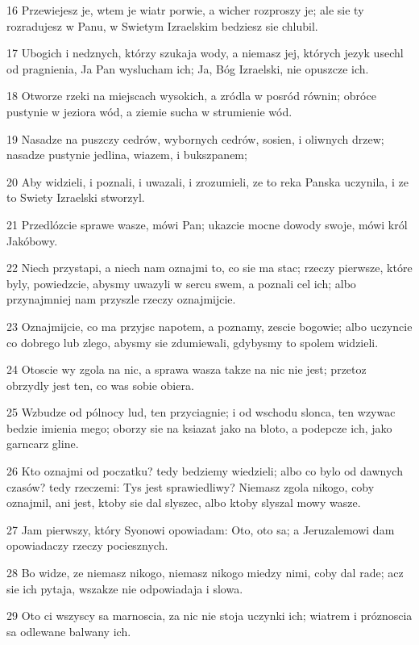 \par 16 Przewiejesz je, wtem je wiatr porwie, a wicher rozproszy je; ale sie ty rozradujesz w Panu, w Swietym Izraelskim bedziesz sie chlubil.
\par 17 Ubogich i nedznych, którzy szukaja wody, a niemasz jej, których jezyk usechl od pragnienia, Ja Pan wyslucham ich; Ja, Bóg Izraelski, nie opuszcze ich.
\par 18 Otworze rzeki na miejscach wysokich, a zródla w posród równin; obróce pustynie w jeziora wód, a ziemie sucha w strumienie wód.
\par 19 Nasadze na puszczy cedrów, wybornych cedrów, sosien, i oliwnych drzew; nasadze pustynie jedlina, wiazem, i bukszpanem;
\par 20 Aby widzieli, i poznali, i uwazali, i zrozumieli, ze to reka Panska uczynila, i ze to Swiety Izraelski stworzyl.
\par 21 Przedlózcie sprawe wasze, mówi Pan; ukazcie mocne dowody swoje, mówi król Jakóbowy.
\par 22 Niech przystapi, a niech nam oznajmi to, co sie ma stac; rzeczy pierwsze, które byly, powiedzcie, abysmy uwazyli w sercu swem, a poznali cel ich; albo przynajmniej nam przyszle rzeczy oznajmijcie.
\par 23 Oznajmijcie, co ma przyjsc napotem, a poznamy, zescie bogowie; albo uczyncie co dobrego lub zlego, abysmy sie zdumiewali, gdybysmy to spolem widzieli.
\par 24 Otoscie wy zgola na nic, a sprawa wasza takze na nic nie jest; przetoz obrzydly jest ten, co was sobie obiera.
\par 25 Wzbudze od pólnocy lud, ten przyciagnie; i od wschodu slonca, ten wzywac bedzie imienia mego; oborzy sie na ksiazat jako na bloto, a podepcze ich, jako garncarz gline.
\par 26 Kto oznajmi od poczatku? tedy bedziemy wiedzieli; albo co bylo od dawnych czasów? tedy rzeczemi: Tys jest sprawiedliwy? Niemasz zgola nikogo, coby oznajmil, ani jest, ktoby sie dal slyszec, albo ktoby slyszal mowy wasze.
\par 27 Jam pierwszy, który Syonowi opowiadam: Oto, oto sa; a Jeruzalemowi dam opowiadaczy rzeczy pociesznych.
\par 28 Bo widze, ze niemasz nikogo, niemasz nikogo miedzy nimi, coby dal rade; acz sie ich pytaja, wszakze nie odpowiadaja i slowa.
\par 29 Oto ci wszyscy sa marnoscia, za nic nie stoja uczynki ich; wiatrem i próznoscia sa odlewane balwany ich.

